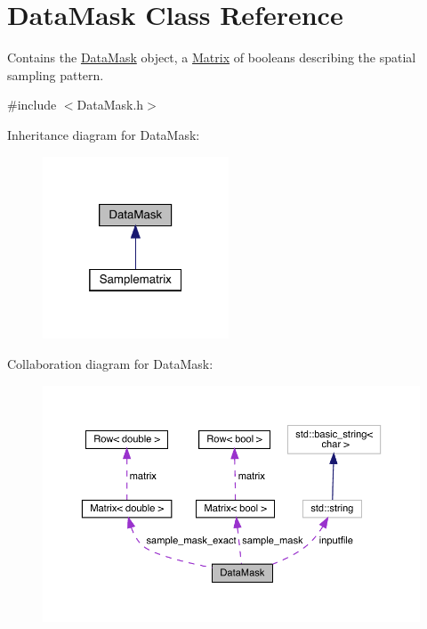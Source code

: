 \hypertarget{class_data_mask}{}\section{Data\+Mask Class Reference}
\label{class_data_mask}


Contains the \hyperlink{class_data_mask}{Data\+Mask} object, a \hyperlink{class_matrix}{Matrix} of booleans describing the spatial sampling pattern.  




{\ttfamily \#include $<$Data\+Mask.\+h$>$}



Inheritance diagram for Data\+Mask\+:\nopagebreak
\begin{figure}[H]
\begin{center}
\leavevmode
\includegraphics[width=157pt]{class_data_mask__inherit__graph}
\end{center}
\end{figure}


Collaboration diagram for Data\+Mask\+:\nopagebreak
\begin{figure}[H]
\begin{center}
\leavevmode
\includegraphics[width=350pt]{class_data_mask__coll__graph}
\end{center}
\end{figure}
